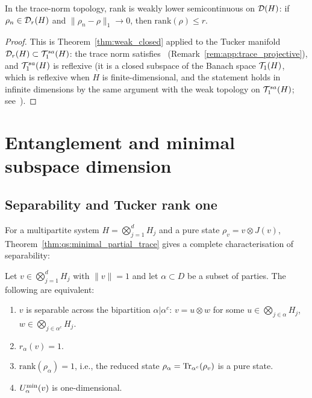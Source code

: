 \begin{corollary}
\label{cor:qs:rank_lsc}
In the trace-norm topology, rank is weakly lower semicontinuous on
$\mathcal{D}(H)$: if $\rho_n \in \mathcal{D}_{r}(H)$ and $\|\rho_n - \rho\|_1
\to 0$, then $\mathrm{rank}(\rho) \leq r$.
\end{corollary}

\begin{proof}
This is Theorem~\ref{thm:weak_closed} applied to the Tucker manifold
$\mathcal{D}_{r}(H) \subset \mathcal{T}_{1}^{sa}(H)$: the trace norm satisfies \condINJ\
(Remark~\ref{rem:app:trace_projective}), and $\mathcal{T}_{1}^{sa}(H)$ is reflexive
(it is a closed subspace of the Banach space $\mathcal{T}_{1}(H)$, which is
reflexive when $H$ is finite-dimensional, and the statement holds in
infinite dimensions by the same argument with the weak topology on
$\mathcal{T}_{1}^{sa}(H)$; see~\cite{BratteliRobinson1987}).
\end{proof}

\section{Entanglement and minimal subspace dimension}
\label{sec:qs:entanglement}

\subsection*{Separability and Tucker rank one}

For a multipartite system $H = \bigotimes_{j=1}^d H_j$ and a pure
state $\rho_v = v \otimes J(v)$, Theorem~\ref{thm:qs:minimal_partial_trace}
gives a complete characterisation of separability:

\begin{proposition}
\label{prop:qs:separability}
Let $v \in \bigotimes_{j=1}^d H_j$ with $\|v\|=1$ and let $\alpha
\subset D$ be a subset of parties. The following are equivalent:
\begin{enumerate}
\item[\textup{(a)}] $v$ is separable across the bipartition
    $\alpha | \alpha^c$: $v = u \otimes w$ for some $u \in
    \bigotimes_{j \in \alpha} H_j$, $w \in \bigotimes_{j \in \alpha^c} H_j$.
\item[\textup{(b)}] $r_\alpha(v) = 1$.
\item[\textup{(c)}] $\mathrm{rank}(\rho_\alpha) = 1$, i.e., the reduced
    state $\rho_\alpha = \mathrm{Tr}_{\alpha^c}(\rho_v)$ is a pure state.
\item[\textup{(d)}] $U^{\min}_{\alpha}(v)$ is one-dimensional.
\end{enumerate}
\end{proposition}

